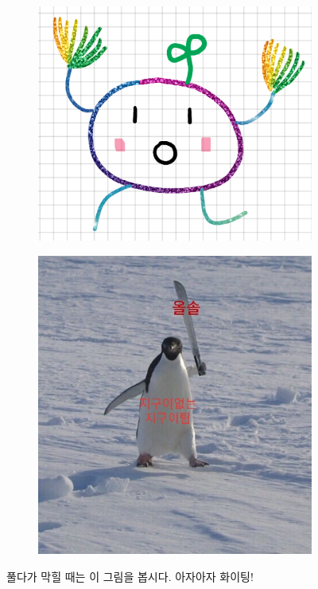 \documentclass[landscape, 8pt, a4paper, oneside, twocolumn]{extarticle}
\begin{document}
\begin{figure}[H]
    \centering
    \begin{subfigure}{0.22\textwidth}
        \centering
        \includegraphics[width=0.95\linewidth]{./cheer_potato.png}
    \end{subfigure}
    \begin{subfigure}{0.22\textwidth}
        \centering
        \includegraphics[width=0.95\linewidth]{./penguin.jpg}
    \end{subfigure}
    \caption{풀다가 막힐 때는 이 그림을 봅시다. 아자아자 화이팅!}
\end{figure}
\newpage
\end{document}
